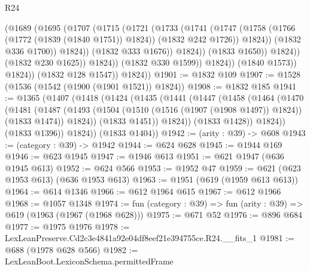 \begin{lexlean}{R24}
\begin{coremodule}
                                  (@1689
                                    (@1695
                                      (@1707
                                        (@1715
                                          (@1721
                                            (@1733
                                              (@1741
                                                (@1747
                                                  (@1758
                                                    (@1766 (@1772 (@1839 (@1840 @1751)) @1824))
                                                    (@1832 @242 @1726))
                                                  @1824))
                                              (@1832 @336 @1700))
                                            @1824))
                                        (@1832 @333 @1676))
                                      @1824))
                                  (@1833 @1650))
                                @1824))
                            (@1832 @230 @1625))
                          @1824))
                      (@1832 @330 @1599))
                    @1824))
                (@1840 @1573))
              @1824))
          (@1832 @128 @1547))
        @1824))
@1901 := @1832 @109
@1907 := @1528 (@1536 (@1542 (@1900 (@1901 @1521)) @1824))
@1908 := @1832 @185
@1941 := @1365
    (@1407
      (@1418
        (@1424
          (@1435
            (@1441
              (@1447
                (@1458
                  (@1464
                    (@1470
                      (@1481
                        (@1487
                          (@1493
                            (@1504 (@1510 (@1516 (@1907 (@1908 @1497)) @1824)) (@1833 @1474))
                            @1824))
                        (@1833 @1451))
                      @1824))
                  (@1833 @1428))
                @1824))
            (@1833 @1396))
          @1824))
      (@1833 @1404))
@1942 := (arity : @39) -> @608
@1943 := (category : @39) -> @1942
@1944 := @624 @628
@1945 := @1944 @169
@1946 := @623 @1945
@1947 := @1946 @613
@1951 := @621 @1947 (@636 @1945 @613)
@1952 := @624 @566
@1953 := @1952 @47
@1959 := @621 (@623 @1953 @613) (@636 @1953 @613)
@1963 := @1951 (@619 (@1959 @613 @613))
@1964 := @614 @1346
@1966 := @612 @1964 @615
@1967 := @612 @1966
@1968 := @1057 @1348
@1974 := fun (category : @39) => fun (arity : @39) => @619 (@1963 (@1967 (@1968 @628)))
@1975 := @671 @52
@1976 := @896 @684
@1977 := @1975 @1976
@1978 := LexLeanPreserve.Cd2c3e4841a92e04df8eef21e394755ce.R24.__fits_1
@1981 := @688 (@1978 @628 @566)
@1982 := LexLeanBoot.LexiconSchema.permittedFrame

\end{coremodule}
\end{lexlean}
